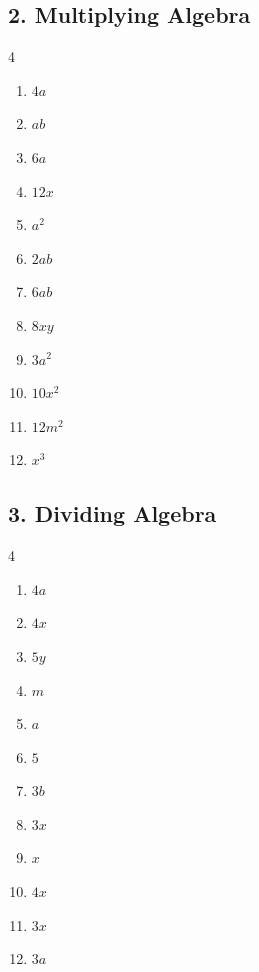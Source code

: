 \documentclass[12pt,a4paper]{article}
\begin{document}
\subsection*{2. Multiplying Algebra}
\begin{multicols}{4}\begin{enumerate}[nosep, label=\arabic*., start=1]
\item $4a$
\item $ab$
\item $6a$
\item $12x$
\item $a^{2}$
\item $2ab$
\item $6ab$
\item $8xy$
\item $3a^{2}$
\item $10x^{2}$
\item $12m^{2}$
\item $x^{3}$
\end{enumerate}\end{multicols}

\subsection*{3. Dividing Algebra}
\begin{multicols}{4}\begin{enumerate}[nosep, label=\arabic*., start=1]
\item $4a$
\item $4x$
\item $5y$
\item $m$
\item $a$
\item $5$
\item $3b$
\item $3x$
\item $x$
\item $4x$
\item $3x$
\item $3a$
\end{enumerate}\end{multicols}
\end{document}
